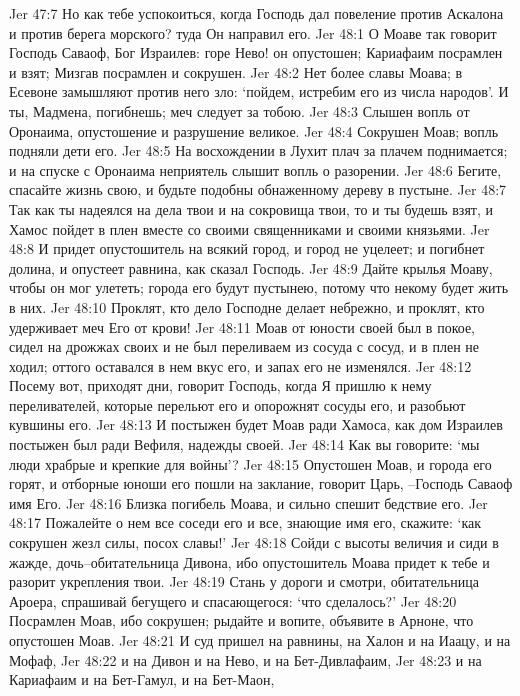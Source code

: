 Jer 47:7  Но как тебе успокоиться, когда Господь дал повеление против Аскалона и против берега морского? туда Он направил его.
Jer 48:1  О Моаве так говорит Господь Саваоф, Бог Израилев: горе Нево! он опустошен; Кариафаим посрамлен и взят; Мизгав посрамлен и сокрушен.
Jer 48:2  Нет более славы Моава; в Есевоне замышляют против него зло: `пойдем, истребим его из числа народов'. И ты, Мадмена, погибнешь; меч следует за тобою.
Jer 48:3  Слышен вопль от Оронаима, опустошение и разрушение великое.
Jer 48:4  Сокрушен Моав; вопль подняли дети его.
Jer 48:5  На восхождении в Лухит плач за плачем поднимается; и на спуске с Оронаима неприятель слышит вопль о разорении.
Jer 48:6  Бегите, спасайте жизнь свою, и будьте подобны обнаженному дереву в пустыне.
Jer 48:7  Так как ты надеялся на дела твои и на сокровища твои, то и ты будешь взят, и Хамос пойдет в плен вместе со своими священниками и своими князьями.
Jer 48:8  И придет опустошитель на всякий город, и город не уцелеет; и погибнет долина, и опустеет равнина, как сказал Господь.
Jer 48:9  Дайте крылья Моаву, чтобы он мог улететь; города его будут пустынею, потому что некому будет жить в них.
Jer 48:10  Проклят, кто дело Господне делает небрежно, и проклят, кто удерживает меч Его от крови!
Jer 48:11  Моав от юности своей был в покое, сидел на дрожжах своих и не был переливаем из сосуда с сосуд, и в плен не ходил; оттого оставался в нем вкус его, и запах его не изменялся.
Jer 48:12  Посему вот, приходят дни, говорит Господь, когда Я пришлю к нему переливателей, которые перельют его и опорожнят сосуды его, и разобьют кувшины его.
Jer 48:13  И постыжен будет Моав ради Хамоса, как дом Израилев постыжен был ради Вефиля, надежды своей.
Jer 48:14  Как вы говорите: `мы люди храбрые и крепкие для войны'?
Jer 48:15  Опустошен Моав, и города его горят, и отборные юноши его пошли на заклание, говорит Царь, --Господь Саваоф имя Его.
Jer 48:16  Близка погибель Моава, и сильно спешит бедствие его.
Jer 48:17  Пожалейте о нем все соседи его и все, знающие имя его, скажите: `как сокрушен жезл силы, посох славы!'
Jer 48:18  Сойди с высоты величия и сиди в жажде, дочь--обитательница Дивона, ибо опустошитель Моава придет к тебе и разорит укрепления твои.
Jer 48:19  Стань у дороги и смотри, обитательница Ароера, спрашивай бегущего и спасающегося: `что сделалось?'
Jer 48:20  Посрамлен Моав, ибо сокрушен; рыдайте и вопите, объявите в Арноне, что опустошен Моав.
Jer 48:21  И суд пришел на равнины, на Халон и на Иаацу, и на Мофаф,
Jer 48:22  и на Дивон и на Нево, и на Бет-Дивлафаим,
Jer 48:23  и на Кариафаим и на Бет-Гамул, и на Бет-Маон,
